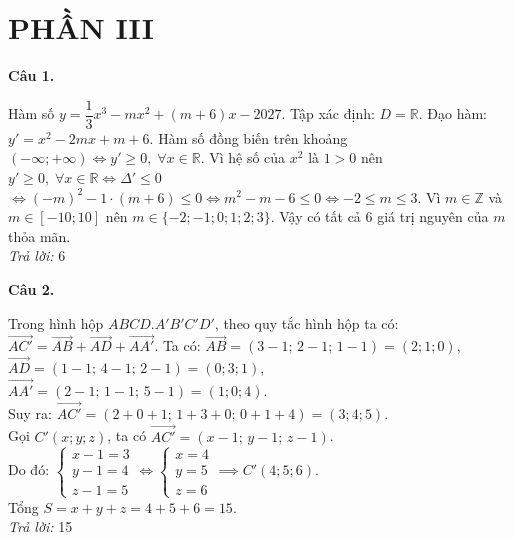 \documentclass[12pt,a4paper]{article}
\newcommand{\loigiai}[1]{\par\medskip\Needspace{4\baselineskip}\noindent\textbf{#1}\par\nobreak}
\begin{document}
\section*{PHẦN III}

\loigiai{Câu 1.}
Hàm số $y=\dfrac{1}{3}x^3-mx^2+(m+6)x-2027$.
Tập xác định: $D=\mathbb{R}$.
Đạo hàm: $y'=x^2-2mx+m+6$.
Hàm số đồng biến trên khoảng $(-\infty;+\infty) \iff y'\ge 0,\;\forall x\in\mathbb{R}$.
Vì hệ số của $x^2$ là $1>0$ nên $y'\ge 0,\;\forall x\in\mathbb{R} \iff \Delta'\le 0$
$\iff (-m)^2-1\cdot(m+6)\le 0 \iff m^2-m-6\le 0 \iff -2\le m\le 3$.
Vì $m\in\mathbb{Z}$ và $m\in[-10;10]$ nên $m\in\{-2;-1;0;1;2;3\}$.
Vậy có tất cả $6$ giá trị nguyên của $m$ thỏa mãn.\\
\textit{Trả lời:} 6

\loigiai{Câu 2.}
Trong hình hộp $ABCD.A'B'C'D'$, theo quy tắc hình hộp ta có:
$\vec{AC'}=\vec{AB}+\vec{AD}+\vec{AA'}$.
Ta có:
$\vec{AB}=(3-1;\,2-1;\,1-1)=(2;1;0)$,\\
$\vec{AD}=(1-1;\,4-1;\,2-1)=(0;3;1)$,\\
$\vec{AA'}=(2-1;\,1-1;\,5-1)=(1;0;4)$.\\
Suy ra:
$\vec{AC'}=(2+0+1;\,1+3+0;\,0+1+4)=(3;4;5)$.\\
Gọi $C'(x;y;z)$, ta có $\vec{AC'}=(x-1;\,y-1;\,z-1)$.\\
Do đó:
$\begin{cases}x-1=3\\y-1=4\\z-1=5\end{cases}\iff\begin{cases}x=4\\y=5\\z=6\end{cases}\implies C'(4;5;6)$.\\
Tổng $S=x+y+z=4+5+6=15$.\\
\textit{Trả lời:} 15
\end{document}
